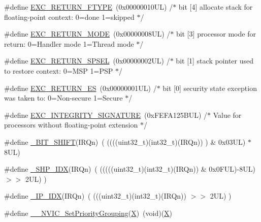 \begin{DoxyCompactItemize}
\item 
\#define \hyperlink{group___c_m_s_i_s___core___n_v_i_c_functions_ga342b51c3eec59822bf206e24ef881a9e}{E\+X\+C\+\_\+\+R\+E\+T\+U\+R\+N\+\_\+\+F\+T\+Y\+PE}~(0x00000010\+U\+L)     /$\ast$ bit \mbox{[}4\mbox{]} allocate stack for floating-\/point context\+: 0=done 1=skipped  $\ast$/
\item 
\#define \hyperlink{group___c_m_s_i_s___core___n_v_i_c_functions_gabb65f847769a7807395b2739cc9702d0}{E\+X\+C\+\_\+\+R\+E\+T\+U\+R\+N\+\_\+\+M\+O\+DE}~(0x00000008\+U\+L)     /$\ast$ bit \mbox{[}3\mbox{]} processor mode for return\+: 0=\+Handler mode 1=\+Thread mode      $\ast$/
\item 
\#define \hyperlink{group___c_m_s_i_s___core___n_v_i_c_functions_ga686922b26c29eac540f53a6213627466}{E\+X\+C\+\_\+\+R\+E\+T\+U\+R\+N\+\_\+\+S\+P\+S\+EL}~(0x00000002\+U\+L)     /$\ast$ bit \mbox{[}1\mbox{]} stack pointer used to restore context\+: 0=\+M\+S\+P 1=\+P\+S\+P           $\ast$/
\item 
\#define \hyperlink{group___c_m_s_i_s___core___n_v_i_c_functions_gac939dbf69d3063c76a28516a4ae84db7}{E\+X\+C\+\_\+\+R\+E\+T\+U\+R\+N\+\_\+\+ES}~(0x00000001\+U\+L)     /$\ast$ bit \mbox{[}0\mbox{]} security state exception was taken to\+: 0=\+Non-\/secure 1=\+Secure $\ast$/
\item 
\#define \hyperlink{group___c_m_s_i_s___core___n_v_i_c_functions_ga7d1b21b2d863ccd9e23a3295b3173155}{E\+X\+C\+\_\+\+I\+N\+T\+E\+G\+R\+I\+T\+Y\+\_\+\+S\+I\+G\+N\+A\+T\+U\+RE}~(0x\+F\+E\+F\+A125\+B\+U\+L)     /$\ast$ Value for processors without floating-\/point extension                $\ast$/
\item 
\#define \hyperlink{group___c_m_s_i_s___core___n_v_i_c_functions_ga53c75b28823441c6153269f0ecbed878}{\+\_\+\+B\+I\+T\+\_\+\+S\+H\+I\+FT}(I\+R\+Qn)~(  ((((uint32\+\_\+t)(int32\+\_\+t)(I\+R\+Qn))         )      \&  0x03\+U\+L) $\ast$ 8\+U\+L)
\item 
\#define \hyperlink{group___c_m_s_i_s___core___n_v_i_c_functions_gaee4f7eb5d7e770ad51489dbceabb1755}{\+\_\+\+S\+H\+P\+\_\+\+I\+DX}(I\+R\+Qn)~( (((((uint32\+\_\+t)(int32\+\_\+t)(I\+R\+Qn)) \& 0x0\+F\+U\+L)-\/8\+U\+L) $>$$>$    2\+U\+L)      )
\item 
\#define \hyperlink{group___c_m_s_i_s___core___n_v_i_c_functions_ga370ec4b1751a6a889d849747df3763a9}{\+\_\+\+I\+P\+\_\+\+I\+DX}(I\+R\+Qn)~(   (((uint32\+\_\+t)(int32\+\_\+t)(I\+R\+Qn))                $>$$>$    2\+U\+L)      )
\item 
\#define \hyperlink{group___c_m_s_i_s___core___n_v_i_c_functions_ga6834dd8c9c59394f1b544b57665293a4}{\+\_\+\+\_\+\+N\+V\+I\+C\+\_\+\+Set\+Priority\+Grouping}(\hyperlink{main_8c_aa6aba27bc1a89db9e350b50bbf881f57}{X})~(void)(\hyperlink{main_8c_aa6aba27bc1a89db9e350b50bbf881f57}{X})

\end{DoxyCompactItemize}
